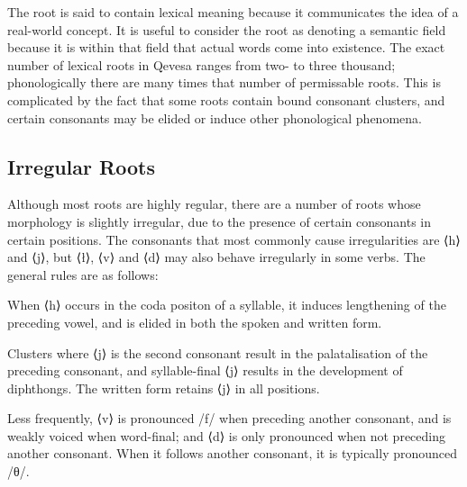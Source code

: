 \documentclass[grammar]{subfiles}
\begin{document}
  The root is said to contain lexical meaning because it communicates the idea of a real-world concept. It is useful to consider the root as denoting a semantic field because it is within that field that actual words come into existence. 
  The exact number of lexical roots in Qevesa ranges from two- to three thousand; phonologically there are many times that number of permissable roots. This is complicated by the fact that some roots contain bound consonant clusters, and certain consonants may be elided or induce other phonological phenomena.

  \subsection{Irregular Roots}
  \label{ssec:mt_irregular_roots}

  Although most roots are highly regular, there are a number of roots whose morphology is slightly irregular, due to the presence of certain consonants in certain positions. 
  The consonants that most commonly cause irregularities are ⟨h⟩ and ⟨j⟩, but ⟨ł⟩, ⟨v⟩ and ⟨d⟩ may also behave irregularly in some verbs. 
  The general rules are as follows:

  \begin{itemize*}
    \item When ⟨h⟩ occurs in the coda positon of a syllable, it induces lengthening of the preceding vowel, and is elided in both the spoken and written form.
    \item Clusters where ⟨j⟩ is the second consonant result in the palatalisation of the preceding consonant, and syllable-final ⟨j⟩ results in the development of diphthongs. The written form retains ⟨j⟩ in all positions.
    \item Less frequently, ⟨v⟩ is pronounced /f/ when preceding another consonant, and is weakly voiced when word-final; and ⟨d⟩ is only pronounced when not preceding another consonant. When it follows another consonant, it is typically pronounced /θ/.
  \end{itemize*}

  \ToBeWritten

\end{document}
